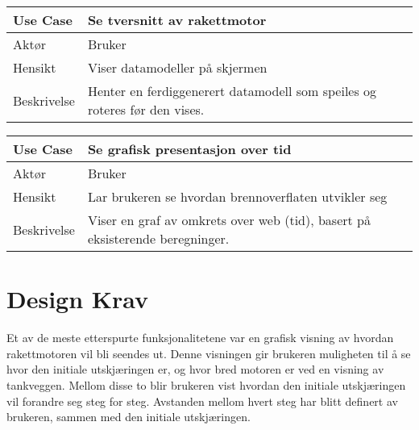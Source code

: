 \begin{center}
  \begin{tabular}{ | l | p{8cm} | }
    \hline
    Use Case & Se tversnitt av rakettmotor \\ \hline
    Aktør & Bruker \\ \hline
    Hensikt & Viser datamodeller på skjermen\\ \hline
    Beskrivelse & Henter en ferdiggenerert datamodell som speiles og roteres før den vises. \\
    \hline
  \end{tabular}
\end{center}

\begin{center}
  \begin{tabular}{ | l | p{8cm} | }
    \hline
    Use Case & Se grafisk presentasjon over tid \\ \hline
    Aktør & Bruker \\ \hline
    Hensikt & Lar brukeren se hvordan brennoverflaten utvikler seg\\ \hline
    Beskrivelse & Viser en graf av omkrets over web (tid), basert på eksisterende beregninger. \\
    \hline
  \end{tabular}
\end{center}

\section{Design Krav}
Et av de meste etterspurte funksjonalitetene var en grafisk visning av hvordan rakettmotoren vil bli seendes ut. Denne visningen gir brukeren muligheten til å se hvor den initiale utskjæringen er, og hvor bred motoren er ved en visning av tankveggen. Mellom disse to blir brukeren vist hvordan den initiale utskjæringen vil forandre seg steg for steg. Avstanden mellom hvert steg har blitt definert av brukeren, sammen med den initiale utskjæringen. 



